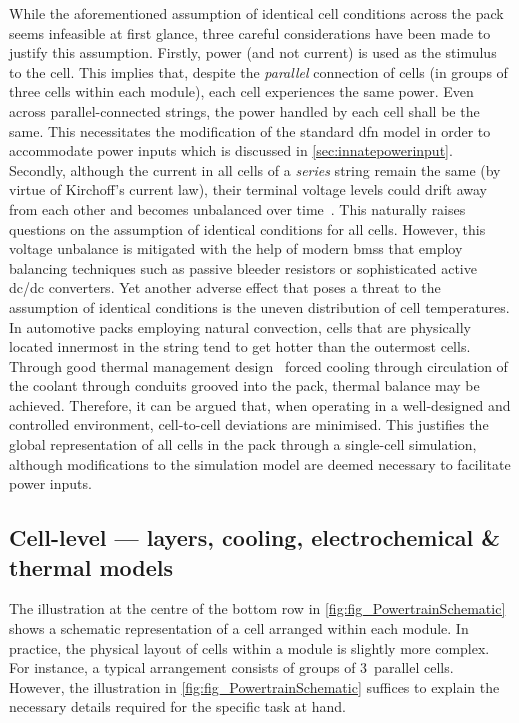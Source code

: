 While the aforementioned assumption of identical cell conditions across the pack
seems infeasible at first glance, three careful considerations have been made to
justify  this assumption.  Firstly,  power  (and not  current)  is  used as  the
stimulus to the cell. This  implies that, despite the \emph{parallel} connection
of cells  (in groups of three  cells within each module),  each cell experiences
the same  power. Even  across parallel-connected strings,  the power  handled by
each cell shall be the same.  This necessitates the modification of the standard
\gls{dfn}  model in  order to  accommodate power  inputs which  is discussed  in
\cref{sec:innatepowerinput}. Secondly,  although the current  in all cells  of a
\emph{series}  string remain  the same  (by virtue  of Kirchoff's  current law),
their  terminal voltage  levels could  drift away  from each  other and  becomes
unbalanced over  time~\cite{Andrea2010}. This naturally raises  questions on the
assumption  of  identical  conditions  for  all  cells.  However,  this  voltage
unbalance is mitigated with the help of modern \glspl{bms} that employ balancing
techniques  such as  passive  bleeder resistors  or  sophisticated active  dc/dc
converters. Yet another adverse effect that  poses a threat to the assumption of
identical  conditions  is  the  uneven distribution  of  cell  temperatures.  In
automotive packs employing natural convection, cells that are physically located
innermost in  the string tend  to get hotter  than the outermost  cells. Through
good thermal management  design \eg~forced cooling through  circulation of the
coolant through conduits grooved into the pack, thermal balance may be achieved.
Therefore,  it  can be  argued  that,  when  operating  in a  well-designed  and
controlled environment,  cell-to-cell deviations  are minimised.  This justifies
the  global representation  of  all  cells in  the  pack  through a  single-cell
simulation, although modifications to the  simulation model are deemed necessary
to facilitate power inputs.



\subsection{Cell-level --- layers, cooling, electrochemical \& thermal models}\label{sec:celllevelxeVinfo}

The    illustration    at     the    centre    of    the     bottom    row    in
\cref{fig:fig_PowertrainSchematic} shows  a schematic  representation of  a cell
arranged within  each module. In practice,  the physical layout of  cells within
a  module  is  slightly  more  complex.  For  instance,  a  typical  arrangement
consists  of  groups   of  3~parallel  cells.  However,   the  illustration  in
\cref{fig:fig_PowertrainSchematic}  suffices to  explain  the necessary  details
required for the specific task at hand.

